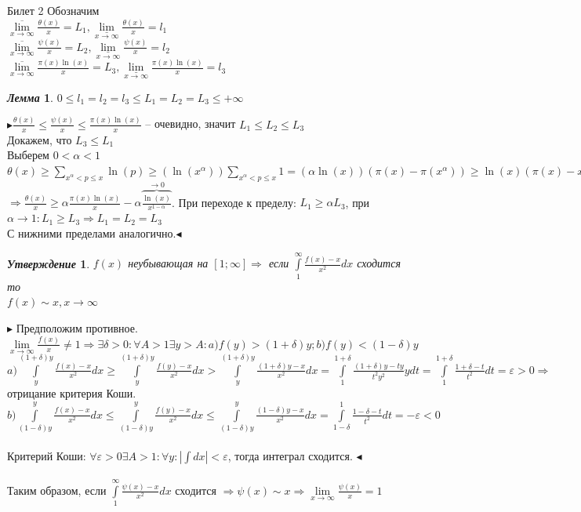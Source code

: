 \documentclass[a4paper,12pt]{article}
\newtheorem{utv}{\textit{Утверждение}}
\newtheorem{lem}{\textit{Лемма}}
\newcommand{\TE}{\theta}
\newcommand{\SI}{\psi}
\newcommand{\q}{\quad}
\newcommand{\pb}{\blacktriangleright}
\newcommand{\pe}{\blacktriangleleft}
\newcommand{\Ra}{\Rightarrow}
\newcommand{\SL}{\sum\limits}
\newcommand{\IL}{\int\limits}
\newcommand{\os}{\left(}
\newcommand{\cs}{\right)}
\begin{document}
\begin{mybox}{\hypertarget{bil2}{Билет 2}}
Обозначим\\
$\underset{x\to\infty}{\overline{\lim}} \frac{\TE(x)}{x} = L_1, \underset{x\to\infty}{\underline{\lim}} \frac{\TE(x)}{x}= l_1$\\
$\underset{x\to\infty}{\overline{\lim}} \frac{\SI(x)}{x} = L_2, \underset{x\to\infty}{\underline{\lim}} \frac{\SI(x)}{x} = l_2$\\
$\underset{x\to\infty}{\overline{\lim}} \frac{\pi(x)\ln(x)}{x} = L_3, \underset{x\to\infty}{\underline{\lim}} \frac{\pi(x)\ln(x)}{x} = l_3$\\
\begin{lem}
$0\le l_1 = l_2 = l_3 \le L_1 = L_2 = L_3 \le +\infty$
\end{lem}
$\pb \frac{\TE(x)}{x} \le \frac{\SI(x)}{x}\le \frac{\pi(x)\ln(x)}{x}$ -- очевидно, значит $L_1 \le L_2 \le L_3$\\
Докажем, что $L_3 \le L_1$\\
Выберем $0<\alpha<1$\\
$\TE(x)  \ge \SL_{x^\alpha <p\le x} \ln(p) \ge \os \ln(x^\alpha) \cs  \SL_{x^\alpha <p\le x} 1 = \os \alpha \ln(x)\cs  \os \pi(x) - \pi(x^\alpha)  \cs \ge \ln(x) \os \pi(x) - x^\alpha  \cs  $\\
$\Ra \frac{\TE(x)}{x} \ge \alpha \frac{\pi(x)\ln(x)}{x} - \alpha \overbrace{\frac{\ln(x)}{x^{1-\alpha}}}^{\to 0}  $. При переходе к пределу: $L_1 \ge \alpha L_3$, при $\alpha \to 1: L_1\ge L_3\Ra L_1 = L_2 = L_3$\\
С нижними пределами аналогично.$\pe$\\
\begin{utv} $f(x)$ неубывающая на $[1;\infty]\Ra$ если $\IL_1^\infty \frac{f(x) - x}{x^2}dx$ сходится то \\$f(x)\sim x, x\to\infty$
\end{utv}
$\pb$ Предположим противное. $\lim\limits_{x\to\infty} \frac{f(x)}{x}\not=1\Ra\exists \delta > 0: \forall A > 1 \exists y > A: a) f(y) > (1+\delta)y; b) f(y) < (1-\delta)y$\\
$a)\IL_y^{(1+\delta)y} \frac{f(x) - x}{x^2}dx \ge \IL_y^{(1+\delta)y} \frac{f(y) - x}{x^2}dx > \IL_y^{(1+\delta)y} \frac{(1+\delta)y - x}{x^2}dx = \IL_1^{1+\delta} \frac{(1+\delta)y - ty}{t^2y^2}ydt = \IL_1^{1+\delta} \frac{1+\delta - t}{t^2}dt = \varepsilon > 0\Ra$ отрицание критерия Коши.\\
$b) \IL_{(1-\delta)y}^y  \frac{f(x) - x}{x^2}dx \le \IL_{(1-\delta)y}^y  \frac{f(y) - x}{x^2}dx \le \IL_{(1-\delta)y}^y  \frac{(1-\delta)y - x}{x^2}dx = \IL_{1-\delta}^1 \frac{1-\delta - t}{t^2}dt = -\varepsilon < 0$\\\q\\
Критерий Коши: $\forall \varepsilon > 0 \exists A > 1: \forall y: |\int dx| < \varepsilon$, тогда интеграл сходится. 
$\pe$\\\q\\
Таким образом, если $\IL_1^\infty\frac{\SI(x) - x}{x^2}dx$ сходится $\Ra \SI(x)\sim x\Ra \lim\limits_{x\to\infty}\frac{\SI(x)}{x} = 1$
\end{mybox}
\end{document}
